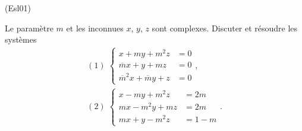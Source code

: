 \begin{tiny}(Esl01)\end{tiny}
Le paramètre $m$ et les inconnues $x$, $y$, $z$ sont complexes. Discuter et résoudre les systèmes
\begin{multline*}
(1)\;\left\lbrace 
\begin{aligned}
 x + my + m^2z &= 0\\
\overline{m} x + y + mz &= 0\\
\overline{m}^2x + \overline{m}y + z &= 0
\end{aligned}
\right. ,\\
(2)\;\left\lbrace 
\begin{aligned}
 x-my+m^2z &=2m\\
mx-m^2y+mz &=2m\\
mx+y-m^2z &=1-m
\end{aligned}
\right. .
\end{multline*}
